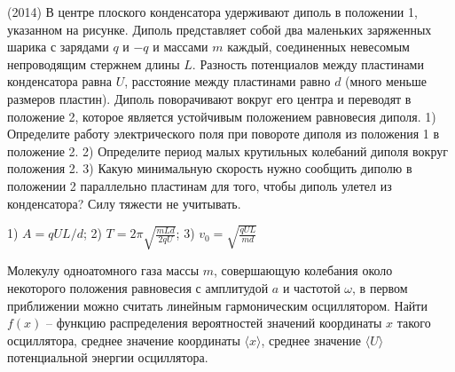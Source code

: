 \begin{ex}
(2014) В центре плоского конденсатора удерживают диполь в положении 1, указанном на рисунке. 
Диполь представляет собой два маленьких заряженных шарика с зарядами $q$ и $-q$ и массами $m$ каждый, 
соединенных невесомым непроводящим стержнем длины $L$. Разность потенциалов между пластинами конденсатора равна $U$, 
расстояние между пластинами равно $d$ (много меньше размеров пластин). Диполь поворачивают вокруг его центра и переводят в положение 2, 
которое является устойчивым положением равновесия диполя. 
1) Определите работу электрического поля при повороте диполя из положения 1 в положение 2. 
2) Определите период малых крутильных колебаний диполя вокруг положения 2. 
3) Какую минимальную скорость нужно сообщить диполю в положении 2 параллельно пластинам для того, чтобы диполь улетел из конденсатора? 
Силу тяжести не учитывать.
\begin{center}

\end{center}
\begin{ans}
1) $A=qUL/d$; 2) $T=2\pi\sqrt{\frac{mLd}{2qU}}$; 3) $v_0 = \sqrt{\frac{qUL}{md }}$
\end{ans}
\end{ex}

\begin{ex}
Молекулу одноатомного газа массы $m$, совершающую колебания около некоторого положения равновесия с амплитудой $a$ и частотой $\omega$, 
в первом приближении можно считать линейным гармоническим осциллятором. 
Найти $f(x)$ -- функцию распределения вероятностей значений координаты $x$ такого осциллятора, среднее значение координаты $\langle x \rangle$, 
среднее значение $\langle U \rangle$ потенциальной энергии осциллятора.
\end{ex}